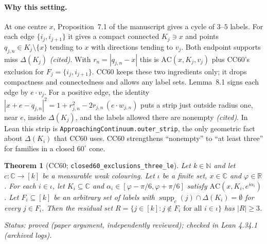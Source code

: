\documentclass[11pt]{article}
\newtheorem{theorem}{Theorem}[section]
\theoremstyle{definition}
\theoremstyle{remark}
\begin{document}
\paragraph{Why this setting.} At one centre $x$, Proposition~7.1 of the
manuscript gives a cycle of $3$--$5$ labels. For each edge
$\{i_j,i_{j+1}\}$ it gives a compact connected $K_j\ni x$ and points
$q_{j,n}\in K_j\setminus\{x\}$ tending to $x$ with directions tending to
$v_j$. Both endpoint supports miss $\Delta(K_j)$ \emph{(cited)}. With
$r_n=|q_{j,n}-x|$ this is $\mathrm{AC}(x,K_j,v_j)$ plus CC60's exclusion for
$F_j=\{i_j,i_{j+1}\}$. CC60 keeps these two ingredients only; it drops
compactness and connectedness and allows any label sets.
Lemma~8.1 signs each edge by $e\cdot v_j$. For a positive edge, the identity
$|x+e-q_{j,n}|^2=1+r_{j,n}^2-2r_{j,n}\,(e\cdot w_{j,n})$ puts a strip just
outside radius one, near $e$, inside $\Delta(K_j)$, and the labels allowed
there are nonempty \emph{(cited)}. In Lean this strip is
\texttt{Approaching\allowbreak{}Continuum.\allowbreak{}outer\_\allowbreak{}strip}, the only geometric fact about
$\Delta(K_i)$ that CC60 uses. CC60 strengthens ``nonempty'' to ``at least
three'' for families in a closed $60^\circ$ cone.

\begin{theorem}[CC60; \texttt{closed60\_\allowbreak{}exclusions\_\allowbreak{}three\_\allowbreak{}le}]\label{thm:cc60}
Let $k\in\mathbb N$ and let $c:\mathbb C\to[k]$ be a measurable weak
colouring. Let $\iota$ be a finite set, $x\in\mathbb C$ and
$\varphi\in\mathbb R$. For each $i\in\iota$, let $K_i\subseteq\mathbb C$ and
$\alpha_i\in[\varphi-\pi/6,\varphi+\pi/6]$ satisfy
$\mathrm{AC}(x,K_i,e^{i\alpha_i})$. Let $F_i\subseteq[k]$ be an arbitrary set
of labels with $\operatorname{supp}_c(j)\cap\Delta(K_i)=\emptyset$ for every
$j\in F_i$. Then the residual set
$R=\{j\in[k]: j\notin F_i\text{ for all }i\in\iota\}$ has $|R|\ge3$.
\end{theorem}
\noindent\emph{Status: proved (paper argument, independently reviewed);
checked in Lean 4.34.1 (archived logs).}
\end{document}

